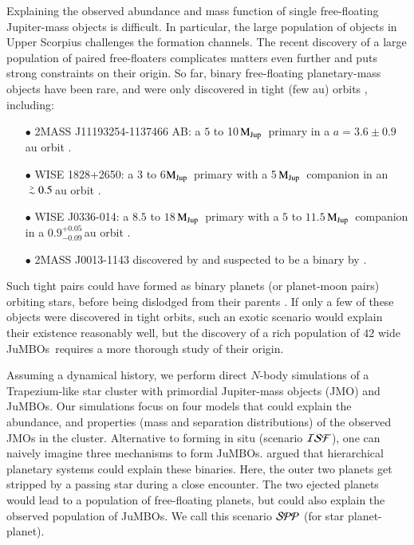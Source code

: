 \documentclass[submission,phys]{lib/SciPost}
\newcommand{\MJup}{\mbox{$\mathrm{{M}}_{\rm Jup}$}}
\def\apgt{\ {\raise-.5ex\hbox{$\buildrel>\over\sim$}}\ }
\newcommand{\jumbos}{\mbox{JuMBOs}}
\begin{document}
Explaining the observed abundance and mass function of single
free-floating Jupiter-mass objects is difficult.  In particular, the
large population of objects in Upper Scorpius challenges the formation
channels. The recent discovery of a large population of paired
free-floaters complicates matters even further and puts strong
constraints on their origin. So far, binary free-floating
planetary-mass objects have been rare, and were only discovered in tight
(few au) orbits \cite{2021ApJS..253....7K}, including:  
\begin{itemize}
\item[$\bullet$]2MASS J11193254-1137466 AB: a $5$ to 10\,\MJup\,
  primary in a $a=3.6\pm0.9$\,au orbit \cite{2017ApJ...843L...4B}.
\item[$\bullet$]WISE 1828+2650: a 3 to 6\MJup\, primary with a
  5\,\MJup\ companion in an $\apgt 0.5$\,au orbit
  \cite{2013ApJ...764..101B}.
\item[$\bullet$] WISE J0336-014: a $8.5$ to
  $18$\,\MJup\ primary with a $5$ to $11.5$\,\MJup\, companion in a
  $0.9^{+0.05}_{-0.09}$\,au orbit \cite{2023ApJ...947L..30C}.
\item[$\bullet$]2MASS J0013-1143 discovered by \cite{2017AJ....154..112K} and
  suspected to be a binary by \cite{2019A&A...629A.145E}.
\end{itemize}

Such tight pairs could have formed as binary planets (or planet-moon
pairs) orbiting stars, before being dislodged from their parents
\cite{2016ApJ...819..125C}.  If only a few of these objects were 
discovered in tight orbits, such an exotic scenario would explain their 
existence reasonably well, but the discovery of a rich population of 
$42$ wide \jumbos\, \cite{2023arXiv231001231P} requires a more thorough 
study of their origin.

Assuming a dynamical history, we perform direct $N$-body simulations of a 
Trapezium-like star cluster with primordial Jupiter-mass objects (JMO) and \jumbos. 
Our simulations focus on four models that could explain the abundance,
and properties (mass and separation distributions) of the observed JMOs in the
cluster. Alternative to forming in situ (scenario ${\cal ISF}$), 
one can naively imagine three mechanisms to
form \jumbos. \cite{2023arXiv231006016W} argued that hierarchical planetary 
systems could explain these binaries. Here, the
outer two planets get stripped by a passing star during a close
encounter. The two ejected planets would lead to a population of free-floating planets, 
but could also explain the observed population of
\jumbos.  We call this scenario ${\cal SPP}$ (for star planet-planet).
\end{document}
